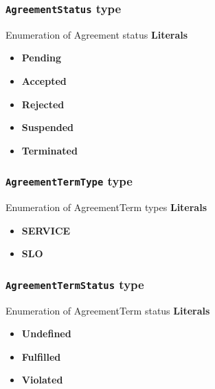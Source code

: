 \subsubsection{\texttt{AgreementStatus} type}
Enumeration of Agreement status
\textbf{Literals}
\begin{itemize}
\item \textbf{Pending} 
\end{itemize}
\begin{itemize}
\item \textbf{Accepted} 
\end{itemize}
\begin{itemize}
\item \textbf{Rejected} 
\end{itemize}
\begin{itemize}
\item \textbf{Suspended} 
\end{itemize}
\begin{itemize}
\item \textbf{Terminated} 
\end{itemize}

\subsubsection{\texttt{AgreementTermType} type}
Enumeration of AgreementTerm types
\textbf{Literals}
\begin{itemize}
\item \textbf{SERVICE} 
\end{itemize}
\begin{itemize}
\item \textbf{SLO} 
\end{itemize}

\subsubsection{\texttt{AgreementTermStatus} type}
Enumeration of AgreementTerm status
\textbf{Literals}
\begin{itemize}
\item \textbf{Undefined} 
\end{itemize}
\begin{itemize}
\item \textbf{Fulfilled} 
\end{itemize}
\begin{itemize}
\item \textbf{Violated} 
\end{itemize}

